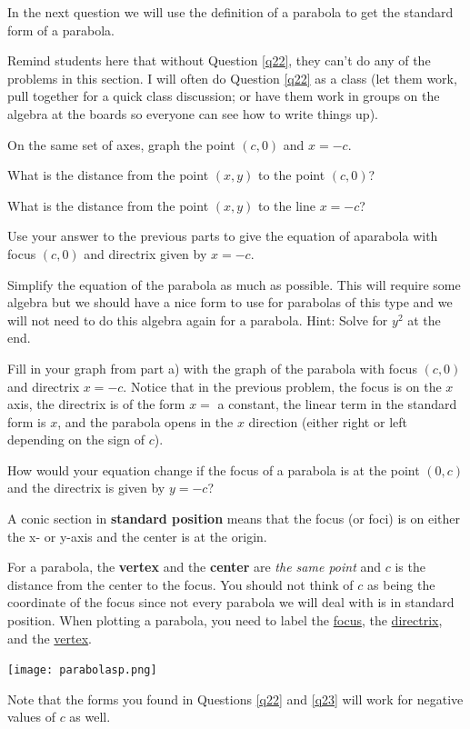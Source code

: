 In the next question we will use the definition of a parabola to get the standard form of a parabola.\begin{annotation}
Remind students here that without Question \ref{q22}, they can't do any of the problems in this section. I will often do Question \ref{q22} as a class (let them work, pull together for a quick class discussion; or have them work in groups on the algebra at the boards so everyone can see how to write things up).
\end{annotation}
\bq\label{q22} \be
\item On the same set of axes, graph the point $(c,0)$ and $x=-c$.
\item What is the distance from the point $(x,y)$ to the point $(c,0)$?
\item What is the distance from the point $(x,y)$ to the line $x=-c$?
\item Use your answer to the previous parts to give the equation of a\break parabola with focus $(c,0)$ and directrix given by $x= -c$.
\item Simplify the equation of the parabola as much as possible. This will require some algebra but we should have a nice form to use for parabolas of this type and we will not need to do this algebra again for a parabola. Hint: Solve for $y^2$ at the end.
\item Fill in your graph from part a) with the graph of the parabola with focus $(c,0)$ and directrix $x= -c$.
\ee \eq
Notice that in the previous problem, the focus is on the $x$ axis, the directrix is of the form $x=$ a constant, the linear term in the standard form is $x$, and the parabola opens in the $x$ direction (either right or left depending on the sign of $c$).

\question\label{q23} How would your equation change if the focus of a parabola is at the point $(0,c)$ and the directrix is given by $y=-c$?

\begin{info} A conic section in \textbf{standard position} means that the focus (or foci) is on either the x- or y-axis and the center is at the origin.

For a parabola, the \textbf{vertex} and the \textbf{center} are \emph{the same point} and $c$ is the distance from the center to the focus. You should not think of $c$ as being the coordinate of the focus since not every parabola we will deal with is in standard position. When plotting a parabola, you need to label the \underline{focus}, the \underline{directrix}, and the \underline{vertex}.

\begin{center} \texttt{[image: parabolasp.png]} \end{center}

Note that the forms you found in Questions \ref{q22} and \ref{q23} will work for negative values of $c$ as well.
\end{info}

